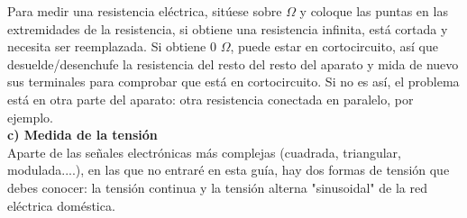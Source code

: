 \documentclass[a5paper,twoside,openany]{book}
\begin{document}
Para medir una resistencia eléctrica, sitúese sobre $\Omega$ y coloque las puntas en las extremidades de la resistencia, si obtiene una resistencia infinita, está cortada y necesita ser reemplazada.
Si obtiene 0 $\Omega$, puede estar en cortocircuito, así que desuelde/desenchufe la resistencia del resto del resto del aparato y mida de nuevo sus terminales para comprobar que está en cortocircuito. Si no es así, el problema está en otra parte del aparato: otra resistencia conectada en paralelo, por ejemplo.\\

\textbf{
c) Medida de la tensión}\\
Aparte de las señales electrónicas más complejas (cuadrada, triangular, modulada....), en las que no entraré en esta guía, hay dos formas de tensión que debes conocer: la tensión continua y la tensión alterna "sinusoidal" de la red eléctrica doméstica.
\end{document}
